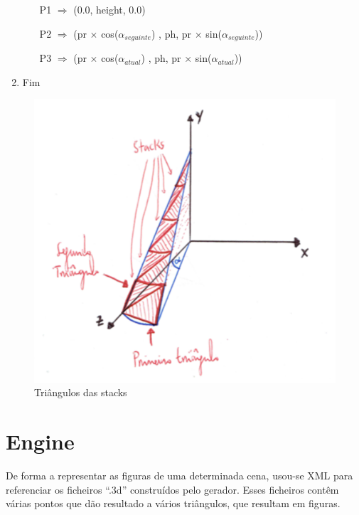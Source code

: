 \documentclass[a4paper]{article}
\begin{document}
\begin{enumerate}
\begin{enumerate}
        \hspace{3cm} P1 $\Rightarrow$ (0.0, height, 0.0)

    \vspace{0.2cm}

        \hspace{0.5cm} P2 $\Rightarrow$ (pr $\times$ cos($\alpha_{seguinte}$) , ph, pr $\times$ sin($\alpha_{seguinte}$))

    \vspace{0.2cm}

        \hspace{1cm} P3 $\Rightarrow$ (pr $\times$ cos($\alpha_{atual}$) , ph, pr $\times$ sin($\alpha_{atual}$))

    \vspace{0.3cm}

  \end{enumerate}

  \item Fim
\end{enumerate}
\rmfamily

\begin{figure}[H]
\centering
\includegraphics[scale=0.50]{cone_triangulos.png}
\caption{Triângulos das stacks}
\label{img:cone_triangulos}
\end{figure}

\newpage

\section{Engine}
\label{sec:engine}
De forma a representar as figuras de uma determinada cena, usou-se XML para referenciar os ficheiros “.3d” construídos pelo gerador. Esses ficheiros contêm várias pontos que dão resultado a vários triângulos, que resultam em figuras.
\end{document}
